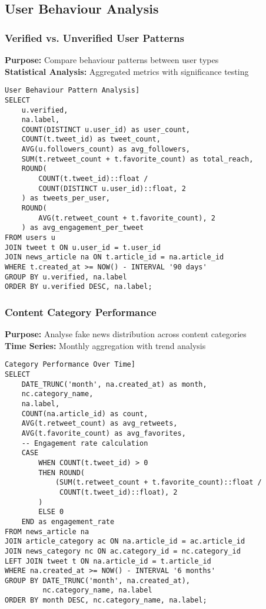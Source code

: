\documentclass[11pt,a4paper]{article}
\begin{document}
\subsection{User Behaviour Analysis}

\subsubsection{Verified vs. Unverified User Patterns}
\textbf{Purpose:} Compare behaviour patterns between user types\\
\textbf{Statistical Analysis:} Aggregated metrics with significance testing

\begin{verbatim}User Behaviour Pattern Analysis]
SELECT 
    u.verified,
    na.label,
    COUNT(DISTINCT u.user_id) as user_count,
    COUNT(t.tweet_id) as tweet_count,
    AVG(u.followers_count) as avg_followers,
    SUM(t.retweet_count + t.favorite_count) as total_reach,
    ROUND(
        COUNT(t.tweet_id)::float / 
        COUNT(DISTINCT u.user_id)::float, 2
    ) as tweets_per_user,
    ROUND(
        AVG(t.retweet_count + t.favorite_count), 2
    ) as avg_engagement_per_tweet
FROM users u
JOIN tweet t ON u.user_id = t.user_id
JOIN news_article na ON t.article_id = na.article_id
WHERE t.created_at >= NOW() - INTERVAL '90 days'
GROUP BY u.verified, na.label
ORDER BY u.verified DESC, na.label;
\end{verbatim}

\subsubsection{Content Category Performance}
\textbf{Purpose:} Analyse fake news distribution across content categories\\
\textbf{Time Series:} Monthly aggregation with trend analysis

\begin{verbatim}Category Performance Over Time]
SELECT 
    DATE_TRUNC('month', na.created_at) as month,
    nc.category_name,
    na.label,
    COUNT(na.article_id) as count,
    AVG(t.retweet_count) as avg_retweets,
    AVG(t.favorite_count) as avg_favorites,
    -- Engagement rate calculation
    CASE 
        WHEN COUNT(t.tweet_id) > 0 
        THEN ROUND(
            (SUM(t.retweet_count + t.favorite_count)::float / 
             COUNT(t.tweet_id)::float), 2
        )
        ELSE 0 
    END as engagement_rate
FROM news_article na
JOIN article_category ac ON na.article_id = ac.article_id
JOIN news_category nc ON ac.category_id = nc.category_id
LEFT JOIN tweet t ON na.article_id = t.article_id
WHERE na.created_at >= NOW() - INTERVAL '6 months'
GROUP BY DATE_TRUNC('month', na.created_at), 
         nc.category_name, na.label
ORDER BY month DESC, nc.category_name, na.label;
\end{verbatim}
\end{document}
